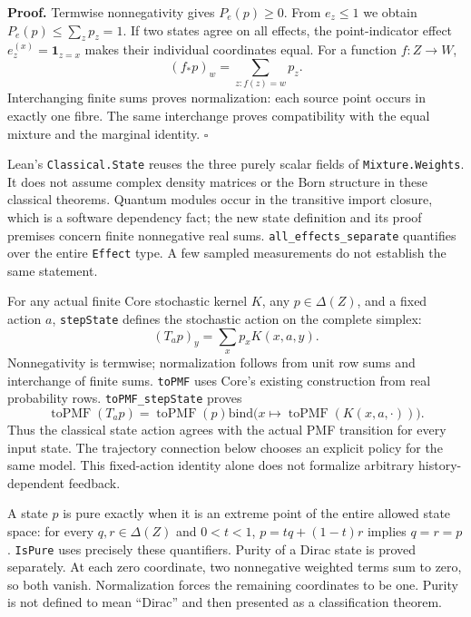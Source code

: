 \documentclass[
  11pt,
  oneside]{book}
\begin{document}
\textbf{Proof.} Termwise nonnegativity gives \(P_e(p)\ge0\). From
\(e_z\le1\) we obtain \(P_e(p)\le\sum_zp_z=1\). If two states agree on
all effects, the point-indicator effect \(e^{(x)}_z=\mathbf1_{z=x}\)
makes their individual coordinates equal. For a function \(f:Z\to W\),
\[
(f_*p)_w=\sum_{z:f(z)=w}p_z.
\] Interchanging finite sums proves normalization: each source point
occurs in exactly one fibre. The same interchange proves compatibility
with the equal mixture and the marginal identity. \(\square\)

Lean's \texttt{Classical.\allowbreak State} reuses the three purely scalar fields of
\texttt{Mixture.\allowbreak Weights}. It does not assume complex density matrices or
the Born structure in these classical theorems. Quantum modules occur in
the transitive import closure, which is a software dependency fact; the
new state definition and its proof premises concern finite nonnegative
real sums. \texttt{all\_\allowbreak effects\_\allowbreak separate} quantifies over the entire
\texttt{Effect} type. A few sampled measurements do not establish the
same statement.

For any actual finite Core stochastic kernel \(K\), any
\(p\in\Delta(Z)\), and a fixed action \(a\), \texttt{step\allowbreak State} defines
the stochastic action on the complete simplex: \[
(T_ap)_y=\sum_xp_xK(x,a,y).
\] Nonnegativity is termwise; normalization follows from unit row sums
and interchange of finite sums. \texttt{to\allowbreak PMF} uses Core's existing
construction from real probability rows. \texttt{to\allowbreak PMF\_\allowbreak step\allowbreak State}
proves \[
\operatorname{toPMF}(T_ap)
=\operatorname{toPMF}(p)\mathbin{\mathrm{bind}}
\bigl(x\mapsto\operatorname{toPMF}(K(x,a,\cdot))\bigr).
\] Thus the classical state action agrees with the actual PMF transition
for every input state. The trajectory connection below chooses an
explicit policy for the same model. This fixed-action identity alone
does not formalize arbitrary history-dependent feedback.

A state \(p\) is pure exactly when it is an extreme point of the entire
allowed state space: for every \(q,r\in\Delta(Z)\) and \(0<t<1\),
\(p=tq+(1-t)r\) implies \(q=r=p\). \texttt{Is\allowbreak Pure} uses precisely these
quantifiers. Purity of a Dirac state is proved separately. At each zero
coordinate, two nonnegative weighted terms sum to zero, so both vanish.
Normalization forces the remaining coordinates to be one. Purity is not
defined to mean ``Dirac'' and then presented as a classification
theorem.
\end{document}
